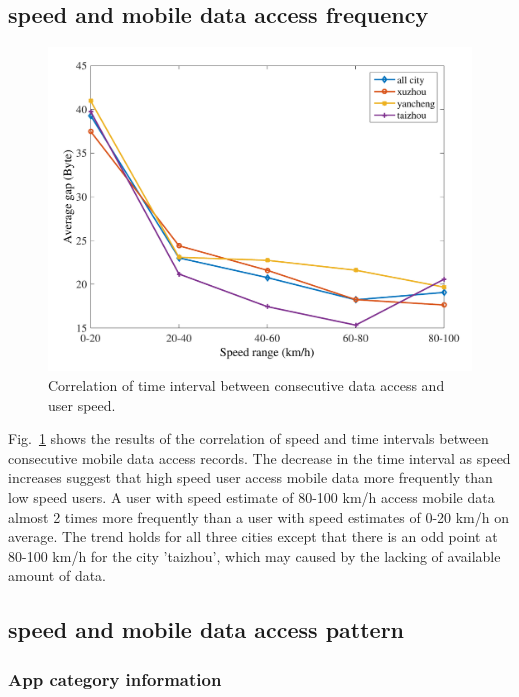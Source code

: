 \subsection{speed and mobile data access frequency}

\begin{figure}[h]
    \centering
    \includegraphics[width=\linewidth]{./figures/speed_gap.pdf}
    \caption{Correlation of time interval between consecutive data access and user speed.}
    \label{fig:speed_gap}
\end{figure}

Fig.~\ref{fig:speed_gap} shows the results of the correlation of speed and time intervals between consecutive mobile data access records. The decrease in the time interval as speed increases suggest that high speed user access mobile data more frequently than low speed users. A user with speed estimate of 80-100 km/h access mobile data almost 2 times more frequently than a user with speed estimates of 0-20 km/h on average. The trend holds for all three cities except that there is an odd point at 80-100 km/h for the city 'taizhou', which may caused by the lacking of available amount of data.

\subsection{speed and mobile data access pattern}

\subsubsection{App category information}

